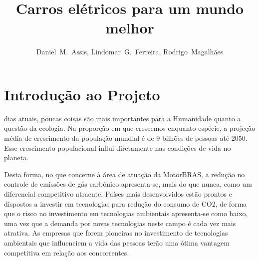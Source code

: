 \documentclass[12pt,journal,compsoc]{IEEEtran}
\begin{document}
\title{Carros elétricos para um mundo melhor}
\author{
  Daniel~M.~Assis, 
  Lindomar~G.~Ferreira, 
  Rodrigo~Magalhães
}


\maketitle

\IEEEdisplaynotcompsoctitleabstractindextext
\IEEEpeerreviewmaketitle


\section{Introdução ao Projeto}

 dias atuais, poucas coisas são mais importantes para a Humanidade quanto a questão da ecologia. Na proporção em que crescemos enquanto espécie, a projeção média de crescimento da população mundial é de 9 bilhões de pessoas até 2050. \cite{wwf_living_2013} Esse crescimento populacional influi diretamente nas condições de vida no planeta.

Desta forma, no que concerne à área de atuação da MotorBRAS, a redução no controle de emissões de gás carbônico apresenta-se, mais do que nunca, como um diferencial competitivo atraente. Países mais desenvolvidos estão prontos e dispostos a investir em tecnologias para redução do consumo de CO2, de forma que o risco no investimento em tecnologias ambientais apresenta-se como baixo, uma vez que a demanda por novas tecnologias neste campo é cada vez mais atrativa. As empresas que forem pioneiras no investimento de tecnologias ambientais que influenciem a vida das pessoas terão uma ótima vantagem competitiva em relação aos concorrentes. 
\end{document}
